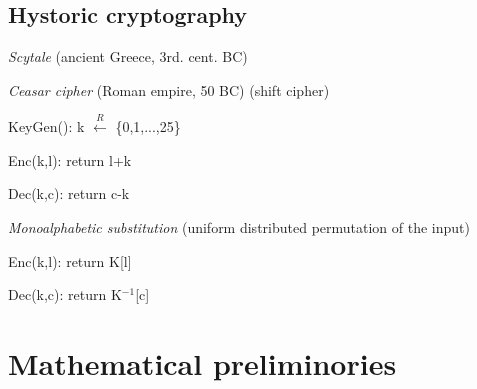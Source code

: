 \documentclass{report}
\begin{document}
 \section{Hystoric cryptography}
 \begin{compactenum}[$\bullet$]
 	\item \textit{Scytale} (ancient Greece, 3rd. cent. BC)
 	\item \textit{Ceasar cipher} (Roman empire, 50 BC) (shift cipher) 
 	\begin{compactenum}[$\bullet$]
 		\item KeyGen(): k $\stackrel{R}{\leftarrow}$ \{0,1,...,25\}
 		\item Enc(k,l): return l+k
 		\item Dec(k,c): return c-k
 	\end{compactenum}
 	\item \textit{Monoalphabetic substitution} (uniform distributed permutation of the input)
 	\begin{compactenum}[$\bullet$]
 		\item Enc(k,l): return K[l]
 		\item Dec(k,c): return K$^{-1}$[c]
 	\end{compactenum}
 \end{compactenum}
 
 \chapter{Mathematical preliminories} 
\end{document}
